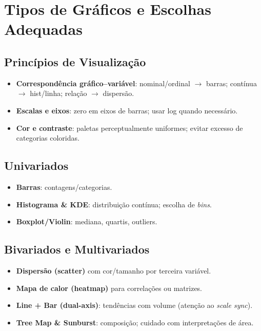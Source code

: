 


\chapter{Tipos de Gráficos e Escolhas Adequadas} %

\section{Princípios de Visualização}
\begin{itemize}[leftmargin=*]
  \item \textbf{Correspondência gráfico–variável}: nominal/ordinal $\rightarrow$ barras; contínua $\rightarrow$ hist/linha; relação $\rightarrow$ dispersão.
  \item \textbf{Escalas e eixos}: zero em eixos de barras; usar log quando necessário.
  \item \textbf{Cor e contraste}: paletas perceptualmente uniformes; evitar excesso de categorias coloridas.
\end{itemize}

\section{Univariados}
\begin{itemize}[leftmargin=*]
  \item \textbf{Barras}: contagens/categorias.
  \item \textbf{Histograma \& KDE}: distribuição contínua; escolha de \textit{bins}.
  \item \textbf{Boxplot/Violin}: mediana, quartis, outliers.
\end{itemize}

\section{Bivariados e Multivariados}
\begin{itemize}[leftmargin=*]
  \item \textbf{Dispersão (scatter)} com cor/tamanho por terceira variável.
  \item \textbf{Mapa de calor (heatmap)} para correlações ou matrizes.
  \item \textbf{Line + Bar (dual-axis)}: tendências com volume (atenção ao \textit{scale sync}).
  \item \textbf{Tree Map \& Sunburst}: composição; cuidado com interpretações de área.
\end{itemize}

